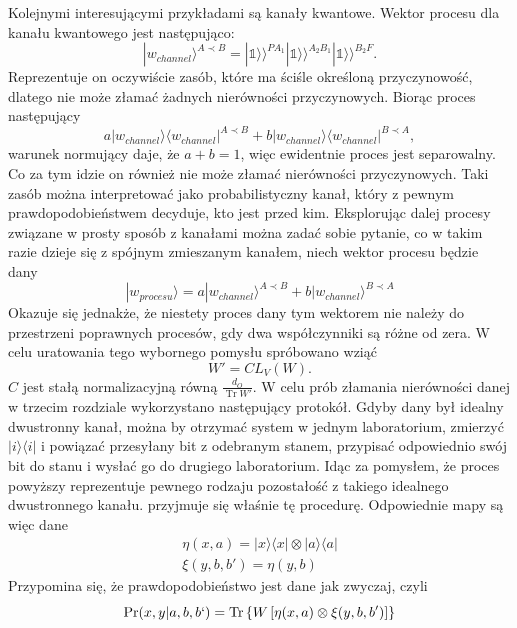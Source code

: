 \documentclass[10pt]{article} %
\DeclareMathOperator{\Trs}{Tr}
\newcommand{\Ket}[1]{|#1\rangle}
\newcommand{\Bra}[1]{\langle#1|}
\newcommand{\KKet}[1]{|#1\rangle\rangle}
\newcommand{\I}{\mathbb{1}}
\begin{document}
Kolejnymi interesującymi przykładami są kanały kwantowe. Wektor procesu dla kanału kwantowego jest następująco:
\begin{equation}
\Ket{w_{channel}}^{A \prec B} = \KKet{\I}^{PA_1}\KKet{\I}^{A_2B_1}\KKet{\I}^{B_2F}.
\end{equation}
Reprezentuje on oczywiście zasób, które ma ściśle określoną przyczynowość, dlatego nie może złamać żadnych nierówności przyczynowych.
Biorąc proces następujący
\begin{equation}
a\Ket{w_{channel}}\Bra{w_{channel}}^{A \prec B} + b\Ket{w_{channel}}\Bra{w_{channel}}^{B \prec A},
\end{equation} warunek normujący daje, że $a+b=1$, więc ewidentnie proces jest separowalny. Co za tym idzie on również nie może złamać nierówności przyczynowych. Taki zasób można interpretować jako probabilistyczny kanał, który z pewnym prawdopodobieństwem decyduje, kto jest przed kim.
Eksplorując dalej procesy związane w prosty sposób z kanałami można zadać sobie pytanie, co w takim razie dzieje się z spójnym zmieszanym kanałem, niech wektor procesu będzie dany
\begin{equation}
\Ket{w_{procesu}} = a\Ket{w_{channel}}^{A \prec B} + b\Ket{w_{channel}}^{B \prec A}
\end{equation}
Okazuje się jednakże, że niestety proces dany tym wektorem nie należy do przestrzeni poprawnych procesów, gdy dwa współczynniki są różne od zera. W celu uratowania tego wybornego pomysłu spróbowano wziąć 
\begin{equation}
W' = CL_V(W).
\end{equation}
$C$ jest stałą normalizacyjną równą $\frac{d_O}{\Trs W'}$.
W celu prób złamania nierówności danej w trzecim rozdziale wykorzystano następujący protokół. Gdyby dany był idealny dwustronny kanał, można by otrzymać system w jednym laboratorium, zmierzyć $\Ket{i}\Bra{i}$ i powiązać przesyłany bit z odebranym stanem, przypisać odpowiednio swój bit do stanu i wysłać go do drugiego laboratorium. Idąc za pomysłem, że proces powyższy reprezentuje pewnego rodzaju pozostałość z takiego idealnego dwustronnego kanału. przyjmuje się właśnie tę procedurę. Odpowiednie mapy są więc dane
\begin{gather}
\eta(x,a) = \Ket{x}\Bra{x} \otimes \Ket{a}\Bra{a} \\
\xi(y,b,b') = \eta(y,b)
\end{gather}
Przypomina się, że prawdopodobieństwo jest dane jak zwyczaj, czyli
\begin{equation}
\Pr(x,y|a,b,b`) = \Trs\left\{{W\left[\eta(x,a) \otimes \xi(y,b,b') \right]}\right\}
\end{equation}
\end{document}
